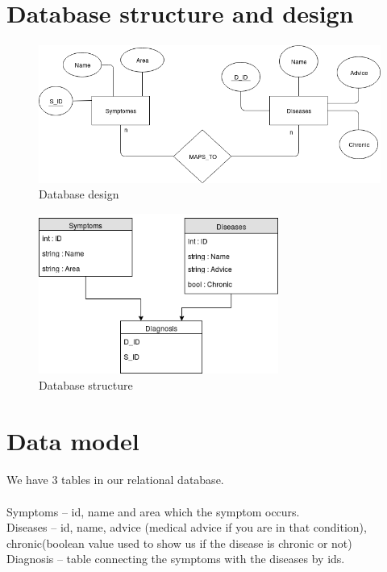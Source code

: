 \section{Database structure and design}
\paragraph{}

\begin{figure}[H]
	\centering
	\includegraphics[width = \textwidth]{DB}
	\caption{Database design}
	\label{db}
\end{figure}

\begin{figure}[H]
	\centering
	\includegraphics[width = 0.7\textwidth]{UML}
	\caption{Database structure}
	\label{uml}
\end{figure}

\section{Data model}
\paragraph{}
We have 3 tables in our relational database.
\paragraph{}
Symptoms – id, name and area which the symptom occurs. \\
Diseases – id, name, advice (medical advice if you are in that condition), chronic(boolean value used to show us if the disease is chronic or not)\\
Diagnosis – table connecting the symptoms with the diseases by ids.
